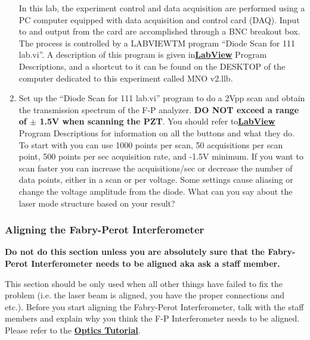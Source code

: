 \documentclass{../lab}
\begin{document}
\begin{enumerate}
    In this lab, the experiment control and data acquisition are performed using a PC computer equipped with data acquisition and control card (DAQ). Input to and output from the card are accomplished through a BNC breakout box. The process is controlled by a LABVIEWTM program ``Diode Scan for 111 lab.vi''. A description of this program is given in\href{http://experimentationlab.berkeley.edu/node/119}{\textbf{}}\href{http://experimentationlab.berkeley.edu/node/119}{\textbf{LabView}} Program Descriptions, and a shortcut to it can be found on the DESKTOP of the computer dedicated to this experiment called MNO v2.llb.
    
    \item Set up the ``Diode Scan for 111 lab.vi'' program to do a 2Vpp scan and obtain the transmission spectrum of the F-P analyzer. \textbf{DO NOT exceed a range of $\pm$ 1.5V when scanning the PZT}. You should refer to\href{http://experimentationlab.berkeley.edu/node/119}{\textbf{}}\href{http://experimentationlab.berkeley.edu/node/119}{\textbf{LabView}} Program Descriptions for information on all the buttons and what they do. To start with you can use 1000 points per scan, 50 acquisitions per scan point, 500 points per sec acquisition rate, and -1.5V minimum. If you want to scan faster you can increase the acquisitions/sec or decrease the number of data points, either in a scan or per voltage. Some settings cause aliasing or change the voltage amplitude from the diode. What can you say about the laser mode structure based on your result?

\end{enumerate}

\subsubsection{Aligning the Fabry-Perot Interferometer}

\textbf{Do not do this section unless you are absolutely sure that the Fabry-Perot Interferometer needs to be aligned aka ask a staff member.}

This section should be only used when all other things have failed to fix the problem (i.e. the laser beam is aligned, you have the proper connections and etc.). Before you start aligning the Fabry-Perot Interferometer, talk with the staff members and explain why you think the F-P Interferometer needs to be aligned. Please refer to the \href{http://experimentationlab.berkeley.edu/OpticsTutorial}{\textbf{Optics Tutorial}}.
\end{document}
